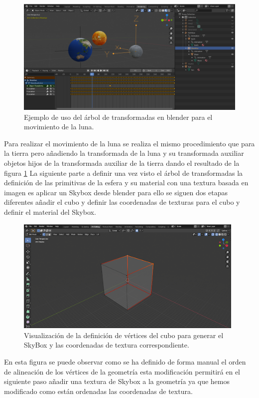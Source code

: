 \documentclass[a4paper]{book}
\begin{document}
\begin{figure}[H]
    \centering
    \includegraphics[width=14cm, keepaspectratio]{img/MoonAux.png}
    \caption{Ejemplo de uso del árbol de transformadas en blender para el movimiento de la luna.}
    \label{MoonAux}
\end{figure}

Para realizar el movimiento de la luna se realiza el mismo procedimiento que para la tierra pero añadiendo la transformada de la
luna y su transformada auxiliar objetos hijos de la transformada auxiliar de la tierra dando el resultado de la figura \ref{MoonAux} La
siguiente parte a definir una vez visto el árbol de transformadas la definición de las primitivas de la esfera y su material con
una textura basada en imagen es aplicar un Skybox desde blender para ello se siguen dos etapas diferentes añadir el cubo y definir
las coordenadas de texturas para el cubo y definir el material del Skybox.

\begin{figure}[H]
    \centering
    \includegraphics[width=11cm, keepaspectratio]{img/SkyBoxBlender.png}
    \caption{Visualización de la definición de vértices del cubo para generar el SkyBox y las coordenadas de textura correspondiente.}
    \label{SkyBoxBlender}
\end{figure}

En esta figura se puede observar como se ha definido de forma manual el orden de alineación de los vértices de la geometría esta
modificación permitirá en el siguiente paso añadir una textura de Skybox a la geometría ya que hemos modificado como están
ordenadas las coordenadas de textura.
\end{document}
